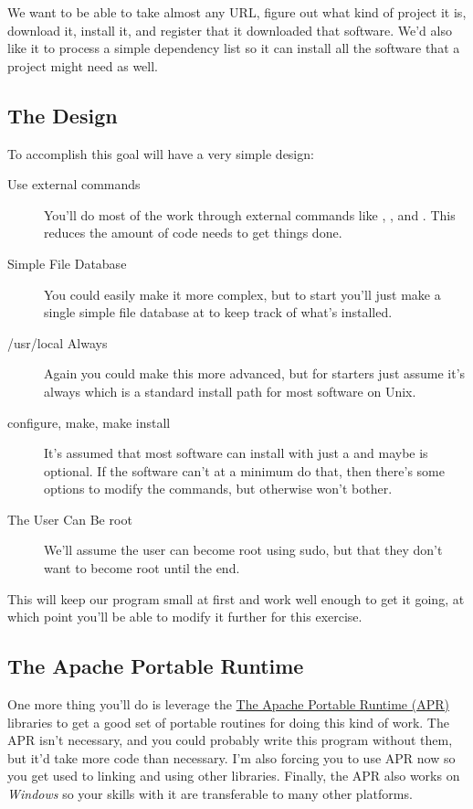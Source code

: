 We want  to be able to take almost any URL, figure
out what kind of project it is, download it, install it, and register
that it downloaded that software.  We'd also like it to process a
simple dependency list so it can install all the software that a
project might need as well.

\subsection{The Design}

To accomplish this goal  will have a very simple design:

\begin{description}
\item[Use external commands] You'll do most of the work through external
    commands like , , and .  This
    reduces the amount of code  needs to get things done.
\item[Simple File Database] You could easily make it more complex, but to
    start you'll just make a single simple file database at
     to keep track of what's installed.
\item[/usr/local Always] Again you could make this more advanced, but for
    starters just assume it's always  which is a standard
    install path for most software on Unix.
\item[configure, make, make install] It's assumed that most software can
    install with just a  and maybe
     is optional.  If the software can't at a minimum
    do that, then there's some options to modify the commands, but otherwise
     won't bother.
\item[The User Can Be root] We'll assume the user can become root using
    sudo, but that they don't want to become root until the end.
\end{description}

This will keep our program small at first and work well enough to get it
going, at which point you'll be able to modify it further for this exercise.


\subsection{The Apache Portable Runtime}

One more thing you'll do is leverage the \href{http://apr.apache.org/}{The
Apache Portable Runtime (APR)} libraries to get a good set of portable routines
for doing this kind of work.  The APR isn't necessary, and you could probably
write this program without them, but it'd take more code than necessary.
I'm also forcing you to use APR now so you get used to linking and using
other libraries.  Finally, the APR also works on \emph{Windows} so your
skills with it are transferable to many other platforms.

